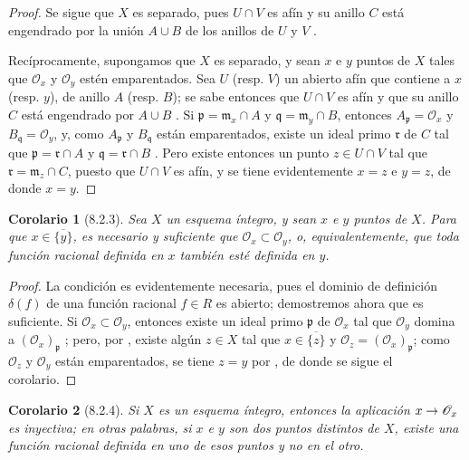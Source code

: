 \documentclass[oneside]{amsart}
\theoremstyle{ega-env-style}
\theoremstyle{ega-thm-env-style}
\newtheorem*{corollary}{Corolario}
\theoremstyle{ega-defn-env-style}
\renewcommand{\to}{\mathchoice{\longrightarrow}{\rightarrow}{\rightarrow}{\rightarrow}}
\let\EGAOriginalLabel\label
\renewcommand{\label}[1]{\phantomsection\EGAOriginalLabel{#1}}
\begin{document}
\begin{proof}
Se sigue que $X$ es separado, pues $U\cap V$ es afín y su anillo $C$ está engendrado por la unión $A\cup B$ de los anillos de $U$ y $V$ .

Recíprocamente, supongamos que $X$ es separado, y sean $x$ e $y$ puntos de $X$ tales que $\mathscr{O}_x$ y $\mathscr{O}_y$ estén emparentados.
Sea $U$ (resp. $V$) un abierto afín que contiene a $x$ (resp. $y$), de anillo $A$ (resp. $B$);
se sabe entonces que $U\cap V$ es afín y que su anillo $C$ está engendrado por $A\cup B$ .
Si $\mathfrak p=\mathfrak m_x\cap A$ y $\mathfrak q=\mathfrak m_y\cap B$, entonces $A_\mathfrak p=\mathscr{O}_x$ y $B_\mathfrak q=\mathscr{O}_y$, y, como $A_\mathfrak p$ y $B_\mathfrak q$ están emparentados, existe un ideal primo $\mathfrak r$ de $C$ tal que $\mathfrak p=\mathfrak r\cap A$ y $\mathfrak q=\mathfrak r\cap B$ .
Pero existe entonces un punto $z\in U\cap V$ tal que $\mathfrak r=\mathfrak m_z\cap C$, puesto que $U\cap V$ es afín, y se tiene evidentemente $x=z$ e $y=z$, de donde $x=y$.
\end{proof}

\begin{corollary}[8.2.3]
\label{I.8.2.3}
Sea $X$ un esquema \emph{íntegro}, y sean $x$ e $y$ puntos de $X$.
Para que $x\in\overline{\{y\}}$, es necesario y suficiente que
$\mathscr{O}_x\subset\mathscr{O}_y$, o, equivalentemente, que toda función racional
definida en $x$ también esté definida en $y$.
\end{corollary}

\begin{proof}
La condición es evidentemente necesaria, pues el dominio de definición
$\delta(f)$ de una función racional $f\in R$ es abierto; demostremos ahora
que es suficiente.
Si $\mathscr{O}_x\subset\mathscr{O}_y$, entonces existe un ideal primo $\mathfrak p$
de $\mathscr{O}_x$ tal que $\mathscr{O}_y$ domina a
$(\mathscr{O}_x)_\mathfrak p$ ; pero, por , existe
algún $z\in X$ tal que $x\in\overline{\{z\}}$ y
$\mathscr{O}_z=(\mathscr{O}_x)_\mathfrak p$; como $\mathscr{O}_z$ y $\mathscr{O}_y$ están
emparentados, se tiene $z=y$ por , de donde se sigue el
corolario.
\end{proof}

\begin{corollary}[8.2.4]
\label{I.8.2.4}
Si $X$ es un esquema \emph{íntegro}, entonces la aplicación $x\to\mathscr{O}_x$ es inyectiva; en otras palabras, si $x$ e $y$ son dos puntos distintos de $X$, existe una función racional definida en uno de esos puntos y no en el otro.
\end{corollary}
\end{document}
